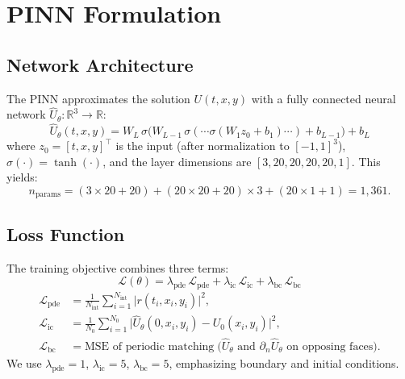 \documentclass[11pt,a4paper]{article}
\newcommand{\R}{\mathbb{R}}
\begin{document}
\section{PINN Formulation}
\label{sec:pinn}

\subsection{Network Architecture}

The PINN approximates the solution $U(t,x,y)$ with a fully connected
neural network $\hat{U}_\theta : \R^3 \to \R$:
\begin{equation}
  \hat{U}_\theta(t, x, y) = W_L \,\sigma\!\big(W_{L-1}\,\sigma(\cdots\sigma(W_1 z_0 + b_1)\cdots) + b_{L-1}\big) + b_L
\end{equation}
where $z_0 = [t, x, y]^\top$ is the input (after normalization to $[-1,1]^3$),
$\sigma(\cdot) = \tanh(\cdot)$, and the layer dimensions are $[3, 20, 20, 20, 20, 1]$.
This yields:
\begin{equation}
  n_{\text{params}} = (3 \times 20 + 20) + (20 \times 20 + 20) \times 3 + (20 \times 1 + 1) = 1{,}361.
\end{equation}

\subsection{Loss Function}

The training objective combines three terms:
\begin{equation}
\boxed{
  \mathcal{L}(\theta) = \lambda_{\text{pde}}\,\mathcal{L}_{\text{pde}}
                       + \lambda_{\text{ic}}\,\mathcal{L}_{\text{ic}}
                       + \lambda_{\text{bc}}\,\mathcal{L}_{\text{bc}}
}
\label{eq:loss}
\end{equation}
\begin{align}
  \mathcal{L}_{\text{pde}} &= \frac{1}{N_{\text{int}}} \sum_{i=1}^{N_{\text{int}}}
    \big| r(t_i, x_i, y_i) \big|^2,
  \label{eq:loss_pde} \\
  \mathcal{L}_{\text{ic}}  &= \frac{1}{N_0} \sum_{i=1}^{N_0}
    \big| \hat{U}_\theta(0, x_i, y_i) - U_0(x_i, y_i) \big|^2,
  \label{eq:loss_ic} \\
  \mathcal{L}_{\text{bc}}  &= \text{MSE of periodic matching}
    \;\big(\hat{U}_\theta \text{ and } \partial_n \hat{U}_\theta
    \text{ on opposing faces}\big).
  \label{eq:loss_bc}
\end{align}
We use $\lambda_{\text{pde}} = 1$, $\lambda_{\text{ic}} = 5$,
$\lambda_{\text{bc}} = 5$, emphasizing boundary and initial conditions.
\end{document}
